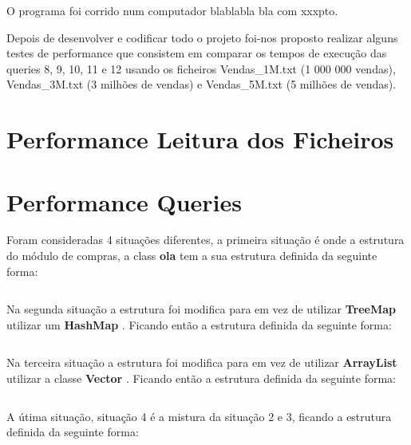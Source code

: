 O programa foi corrido num computador blablabla bla com xxxpto. 

Depois de desenvolver e codificar todo o projeto foi-nos proposto realizar alguns testes de performance que consistem em comparar os tempos de execução das queries 8, 9, 10, 11 e 12 usando os ficheiros Vendas\_1M.txt (1 000 000 vendas), Vendas\_3M.txt (3 milhões de vendas) e Vendas\_5M.txt (5 milhões de vendas).


\section{Performance Leitura dos Ficheiros}




\section{Performance Queries }


Foram consideradas 4 situações diferentes, a primeira situação é onde a estrutura do módulo de
compras, a class \color{blue} \textbf{ola} \color{black} tem a sua estrutura definida da seguinte forma:

\begin{verbatim}

\end{verbatim}

\par Na segunda situação a estrutura foi modifica para em vez de utilizar \color{blue} \textbf{TreeMap} \color{black} utilizar um
\color{blue} \textbf{HashMap} \color{black}. Ficando então a estrutura definida da seguinte forma:

\begin{verbatim}

\end{verbatim}

\par Na terceira situação a estrutura foi modifica para em vez de utilizar \color{blue} \textbf{ArrayList} \color{black} utilizar a
classe  \color{blue} \textbf{Vector} \color{black} . Ficando então a estrutura definida da seguinte forma:

\begin{verbatim}

\end{verbatim}

\par A útima situação, situação 4 é a mistura da situação 2 e 3, ficando a estrutura definida da seguinte forma:

